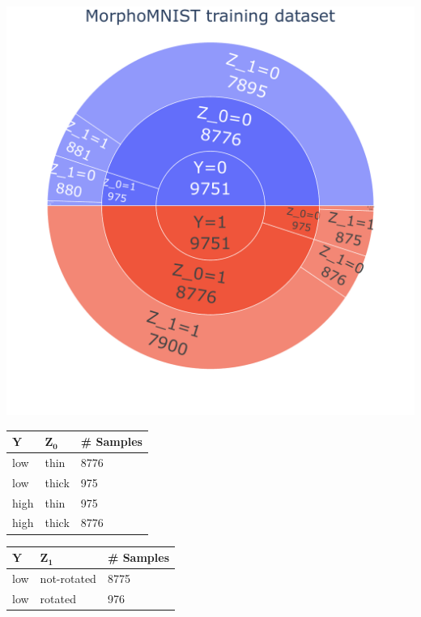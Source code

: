 \documentclass[12pt,DIV14,BCOR12mm,a4paper,footinclude=false,headinclude,parskip=half-,twoside,openright,cleardoublepage=empty,toc=index,bibliography=totoc,listof=totoc]{scrreprt}
\numberwithin{equation}{chapter}
\begin{document}
 \begin{table}[H]
    \begin{minipage}[H]{\linewidth}
        \centering
        \begin{minipage}[H]{0.5\linewidth}
            \centering
            \includegraphics[width=0.8\linewidth]{figures/data_distribution_MorphoMNIST_training_dataset_1.pdf}
        \end{minipage}%
        \hfill
        \begin{minipage}[H]{0.5\linewidth}
            \centering
            \small
            \begin{tabular}{|p{1cm}|p{2cm}|p{2cm}|}
                \hline
                $\mathbf{Y}$ & $\mathbf{Z_0}$ & \# \textbf{Samples } \\
                \hline
                low & thin & 8776 \\
                low & thick & 975\\
                high & thin & 975 \\
                high & thick & 8776\\
                \hline
            \end{tabular}
            \begin{tabular}{|p{1cm}|p{2cm}|p{2cm}|}
                \hline
                $\mathbf{Y}$ & $\mathbf{Z_1}$ & \# \textbf{Samples } \\
                \hline
                low & not-rotated & 8775 \\
                low & rotated & 976\\

\end{tabular}
\end{minipage}
\end{minipage}
\end{table}
\end{document}
